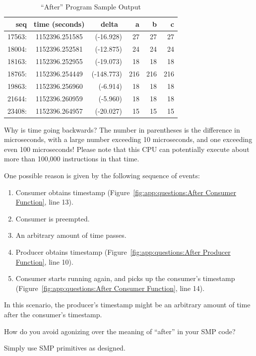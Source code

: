 \begin{table}[htbp]
{ \scriptsize
\begin{tabular}{rcrrrr}
seq    & time (seconds) & delta~    &  a &  b &  c \\
\hline
17563: & 1152396.251585 & (-16.928) & 27 & 27 & 27 \\
18004: & 1152396.252581 & (-12.875) & 24 & 24 & 24 \\
18163: & 1152396.252955 & (-19.073) & 18 & 18 & 18 \\
18765: & 1152396.254449 & (-148.773) & 216 & 216 & 216 \\
19863: & 1152396.256960 & (-6.914) & 18 & 18 & 18 \\
21644: & 1152396.260959 & (-5.960) & 18 & 18 & 18 \\
23408: & 1152396.264957 & (-20.027) & 15 & 15 & 15 \\
\end{tabular}
}
\caption{``After'' Program Sample Output}
\label{fig:app:questions:After Program Sample Output}
\end{table}

Why is time going backwards?
The number in parentheses is the difference in microseconds, with
a large number exceeding 10 microseconds, and one exceeding even
100 microseconds!
Please note that this CPU can potentially execute about more than 100,000 
instructions in that time.

One possible reason is given by the following sequence of events:
\begin{enumerate}
\item	Consumer obtains timestamp
	(Figure~\ref{fig:app:questions:After Consumer Function}, line 13).
\item	Consumer is preempted.
\item	An arbitrary amount of time passes.
\item	Producer obtains timestamp
	(Figure~\ref{fig:app:questions:After Producer Function}, line 10).
\item	Consumer starts running again, and picks up the consumer's
	timestamp
	(Figure~\ref{fig:app:questions:After Consumer Function}, line 14).
\end{enumerate}

In this scenario, the producer's timestamp might be an arbitrary
amount of time after the consumer's timestamp.

How do you avoid agonizing over the meaning of ``after'' in your
SMP code?

Simply use SMP primitives as designed.

